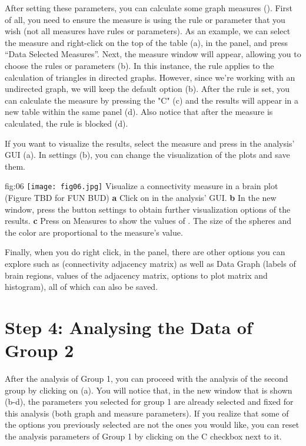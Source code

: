 \documentclass[justified]{tufte-handout}
\begin{document}
 After setting these parameters, you can calculate some graph measures (). First of all, you need to ensure the measure is using the rule or parameter that you wish (not all measures have rules or parameters). As an example, we can select the measure  and right-click on the top of the table (a), in the  panel, and press “Data Selected Measures”. 
 Next, the measure window will appear, allowing you to choose the rules or parameters (b). In this instance, the rule applies to the calculation of triangles in directed graphs. However, since we're working with an undirected graph, we will keep the default option (b).
After the rule is set, you can calculate the measure by pressing the "C" (c) and the results will appear in a new table within the same panel (d). Also notice that after the measure is calculated, the rule is blocked (d).
 
 If you want to visualize the results, select the measure and press  in the analysis' GUI (a). In settings (b), you can change the visualization of the plots and save them. 
 
	{fig:06}
	{
	\texttt{[image: fig06.jpg]}
	}
	{Visualize a connectivity measure in a brain plot (Figure TBD for FUN BUD)}
	{
	{\bf a} Click on  in the analysis' GUI.
        {\bf b} In the new window, press the button settings to obtain further visualization options of the results.
        {\bf c} Press on Measures to show the values of . The size of the spheres and the color are proportional to the measure's value.   
	}
 
 Finally, when you do right click, in the  panel, there are other options you can explore such as  (connectivity adjacency matrix) as well as Data Graph (labels of brain regions, values of the adjacency matrix, options to plot matrix and histogram), all of which can also be saved.
  
\section{Step 4: Analysing the Data of Group 2}

After the analysis of Group 1, you can proceed with the analysis of the second group by clicking on  (a). You will notice that, in the new window that is shown (b-d), the parameters you selected for group 1 are already selected and fixed for this analysis (both graph and measure parameters). If you realize that some of the options you previously selected are not the ones you would like, you can reset the analysis parameters of Group 1 by clicking on the C checkbox next to it.
\end{document}
